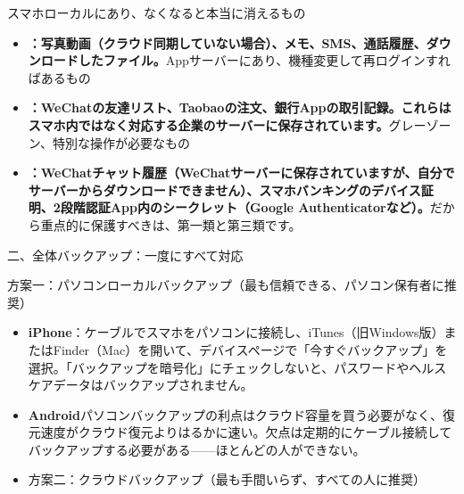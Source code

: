 


スマホローカルにあり、なくなると本当に消えるもの

\begin{itemize}
  \item \textbf{：写真動画（クラウド同期していない場合）、メモ、SMS、通話履歴、ダウンロードしたファイル。}Appサーバーにあり、機種変更して再ログインすればあるもの
  \item \textbf{：WeChatの友達リスト、Taobaoの注文、銀行Appの取引記録。これらはスマホ内ではなく対応する企業のサーバーに保存されています。}グレーゾーン、特別な操作が必要なもの
  \item \textbf{：WeChatチャット履歴（WeChatサーバーに保存されていますが、自分でサーバーからダウンロードできません）、スマホバンキングのデバイス証明、2段階認証App内のシークレット（Google Authenticatorなど）。}だから重点的に保護すべきは、第一類と第三類です。
\end{itemize}

二、全体バックアップ：一度にすべて対応


方案一：パソコンローカルバックアップ（最も信頼できる、パソコン保有者に推奨）


\begin{itemize}
  \item \textbf{iPhone}：ケーブルでスマホをパソコンに接続し、iTunes（旧Windows版）またはFinder（Mac）を開いて、デバイスページで「今すぐバックアップ」を選択。「バックアップを暗号化」にチェックしないと、パスワードやヘルスケアデータはバックアップされません。
  \item \textbf{Android}パソコンバックアップの利点はクラウド容量を買う必要がなく、復元速度がクラウド復元よりはるかに速い。欠点は定期的にケーブル接続してバックアップする必要がある——ほとんどの人ができない。
  \item 方案二：クラウドバックアップ（最も手間いらず、すべての人に推奨）
\end{itemize}


